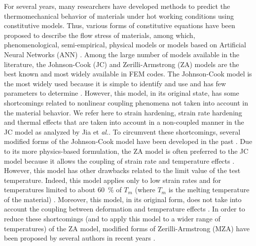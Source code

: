 \documentclass[twoside,english,1p,final,sort&compress]{elsarticle}
\makeatletter
\theoremstyle{plain}
\DeclareRobustCommand{\eal}{et \emph{al.}\@\xspace}
\makeatother
\begin{document}
For several years, many researchers have developed methods to predict the thermomechanical behavior of materials under hot working conditions using constitutive models.
Thus, various forms of constitutive equations have been proposed to describe the flow stress of materials, among which, phenomenological, semi-empirical, physical models or models based on Artificial Neural Networks (ANN) \cite{Rusinek-2010, Shin-2010, Lin-2011, Pantale-2021}.
Among the large number of models available in the literature, the Johnson-Cook (JC) \cite{Johnson-1983} and Zerilli-Armstrong (ZA) \cite{Zerilli-1987} models are the best known and most widely available in FEM codes.
The Johnson-Cook model is the most widely used because it is simple to identify and use and has few parameters to determine \cite{NematNasser-2003, Khan-2004}.
However, this model, in its original state, has some shortcomings related to nonlinear coupling phenomena not taken into account in the material behavior.
We refer here to strain hardening, strain rate hardening and thermal effects that are taken into account in a non-coupled manner in the JC model as analyzed by Jia \eal \cite{Jia-2021}.
To circumvent these shortcomings, several modified forms of the Johnson-Cook model have been developed in the past \cite{Rule-1998, Vural-2003, Lin-2010, Lin-2012, Li-2013, Zhang-2015, Zhou-2019}.
Due to its more physics-based formulation, the ZA model is often preferred to the JC model because it allows the coupling of strain rate and temperature effects \cite{Johnson-1988, Voyiadjis-2005, Dey-2007}.
However, this model has other drawbacks related to the limit value of the test temperature.
Indeed, this model applies only to low strain rates and for temperatures limited to about 60~\% of $T_m$ (where $T_m$ is the melting temperature of the material) \cite{Chiou-2005, Lee-2005, Lee-2006, Chen-2007}.
Moreover, this model, in its original form, does not take into account the coupling between deformation and temperature effects \cite{Samantaray-2009}.
In order to reduce these shortcomings (and to apply this model to a wider range of temperatures) of the ZA model, modified forms of Zerilli-Armstrong (MZA) have been proposed by several authors in recent years \cite{NematNasser-2004, Lennon-2004, Muralli-2017, Cheng-2021, Muralli-2021}.
\end{document}
